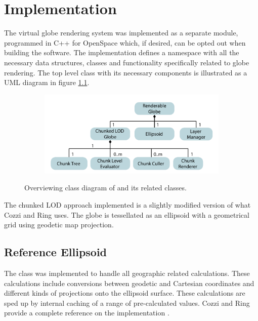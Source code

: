 \chapter{Implementation}
The virtual globe rendering system was implemented as a separate module, programmed in C++ for OpenSpace which, if desired, can be opted out when building the software. The implementation defines a namespace with all the necessary data structures, classes and functionality specifically related to globe rendering. The top level class  with its necessary components is illustrated as a UML diagram in figure \ref{fig:renderableglobe}.

\begin{figure}[htbp]
    \centering
    \begin{subfigure}[bt]{0.8\textwidth}
        \includegraphics[width=\textwidth]{figures/implementation/renderable_globe.pdf}
    \end{subfigure}
    \caption{Overviewing class diagram of  and its related classes.}
    \label{fig:renderableglobe}
\end{figure}

The chunked LOD approach implemented is a slightly modified version of what Cozzi and Ring\cite[p. 445]{cozzi11} uses. The globe is tessellated as an ellipsoid with a geometrical grid using geodetic map projection. 

\section{Reference Ellipsoid}
The  class was implemented to handle all geographic related calculations.  These calculations include conversions between geodetic and Cartesian coordinates and different kinds of projections onto the ellipsoid surface. These calculations are sped up by internal caching of a range of pre-calculated values. Cozzi and Ring provide a complete reference on the implementation \cite[p. 17]{cozzi11}.

